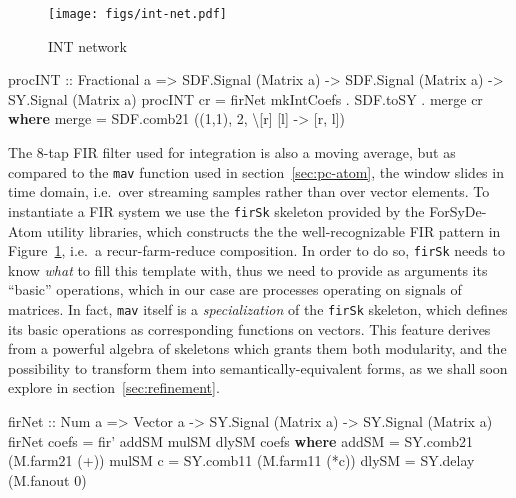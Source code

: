 \documentclass[
  a4paper,
]{article}
\newenvironment{Shaded}{}{}
\newcommand{\DataTypeTok}[1]{\textcolor[rgb]{0.56,0.13,0.00}{#1}}
\newcommand{\DecValTok}[1]{\textcolor[rgb]{0.25,0.63,0.44}{#1}}
\newcommand{\FunctionTok}[1]{\textcolor[rgb]{0.02,0.16,0.49}{#1}}
\newcommand{\KeywordTok}[1]{\textcolor[rgb]{0.00,0.44,0.13}{\textbf{#1}}}
\newcommand{\NormalTok}[1]{#1}
\newcommand{\OtherTok}[1]{\textcolor[rgb]{0.00,0.44,0.13}{#1}}
\begin{document}
\begin{figure}
\hypertarget{fig:int-net-atom}{%
\centering
\texttt{[image: figs/int-net.pdf]}
\caption{INT network}\label{fig:int-net-atom}
}
\end{figure}

\begin{Shaded}
\begin{Highlighting}[numbers=left,,firstnumber=591,]
\OtherTok{procINT ::} \DataTypeTok{Fractional}\NormalTok{ a }\OtherTok{=>} \DataTypeTok{SDF.Signal}\NormalTok{ (}\DataTypeTok{Matrix}\NormalTok{ a) }\OtherTok{->} \DataTypeTok{SDF.Signal}\NormalTok{ (}\DataTypeTok{Matrix}\NormalTok{ a) }\OtherTok{->} \DataTypeTok{SY.Signal}\NormalTok{ (}\DataTypeTok{Matrix}\NormalTok{ a)}
\NormalTok{procINT cr }\FunctionTok{=}\NormalTok{ firNet mkIntCoefs }\FunctionTok{.}\NormalTok{ SDF.toSY }\FunctionTok{.}\NormalTok{ merge cr}
  \KeywordTok{where}
\NormalTok{    merge   }\FunctionTok{=}\NormalTok{ SDF.comb21 ((}\DecValTok{1}\NormalTok{,}\DecValTok{1}\NormalTok{), }\DecValTok{2}\NormalTok{, \textbackslash{}[r] [l] }\OtherTok{->}\NormalTok{ [r, l])}
\end{Highlighting}
\end{Shaded}

The 8-tap FIR filter used for integration is also a moving average, but
as compared to the \texttt{mav} function used in
section~\ref{sec:pc-atom}, the window slides in time domain, i.e.~over
streaming samples rather than over vector elements. To instantiate a FIR
system we use the \texttt{firSk} skeleton provided by the ForSyDe-Atom
utility libraries, which constructs the the well-recognizable FIR
pattern in Figure~\ref{fig:int-net-atom}, i.e.~a recur-farm-reduce
composition. In order to do so, \texttt{firSk} needs to know \emph{what}
to fill this template with, thus we need to provide as arguments its
``basic'' operations, which in our case are processes operating on
signals of matrices. In fact, \texttt{mav} itself is a
\emph{specialization} of the \texttt{firSk} skeleton, which defines its
basic operations as corresponding functions on vectors. This feature
derives from a powerful algebra of skeletons which grants them both
modularity, and the possibility to transform them into
semantically-equivalent forms, as we shall soon explore in
section~\ref{sec:refinement}.

\begin{Shaded}
\begin{Highlighting}[numbers=left,,firstnumber=609,]
\OtherTok{firNet ::} \DataTypeTok{Num}\NormalTok{ a }\OtherTok{=>} \DataTypeTok{Vector}\NormalTok{ a }\OtherTok{->} \DataTypeTok{SY.Signal}\NormalTok{ (}\DataTypeTok{Matrix}\NormalTok{ a) }\OtherTok{->} \DataTypeTok{SY.Signal}\NormalTok{ (}\DataTypeTok{Matrix}\NormalTok{ a)}
\NormalTok{firNet coefs }\FunctionTok{=}\NormalTok{ fir' addSM mulSM dlySM coefs}
  \KeywordTok{where}
\NormalTok{    addSM   }\FunctionTok{=}\NormalTok{ SY.comb21 (M.farm21 (}\FunctionTok{+}\NormalTok{))}
\NormalTok{    mulSM c }\FunctionTok{=}\NormalTok{ SY.comb11 (M.farm11 (}\FunctionTok{*}\NormalTok{c))}
\NormalTok{    dlySM   }\FunctionTok{=}\NormalTok{ SY.delay  (M.fanout }\DecValTok{0}\NormalTok{)}
\end{Highlighting}
\end{Shaded}
\end{document}
